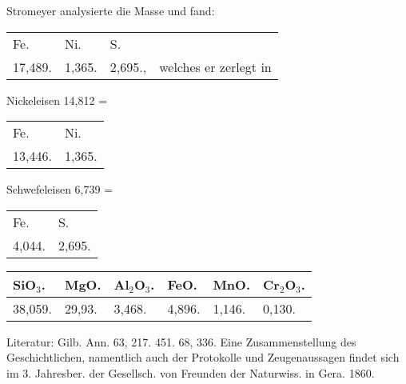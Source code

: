 \documentclass[a4paper, 11pt, oneside]{article}
\begin{document}
Stromeyer analysierte die Masse und fand:
\begin{table}[!ht]
    \centering\swabfamily\Large
    \begin{tabular}{l l l l}
        Fe. & Ni. & S. & \\
        17,489. & 1,365. & 2,695., & welches er zerlegt in \\
    \end{tabular}
\end{table}

\begin{center}
Nickeleisen 14,812 =
\end{center}
\begin{table}[!ht]
    \centering\swabfamily\Large
    \begin{tabular}{l l}
        Fe. & Ni. \\
        13,446. & 1,365. \\
    \end{tabular}
\end{table}

\begin{center}
Schwefeleisen 6,739 =
\end{center}
\begin{table}[!ht]
    \centering\swabfamily\Large
    \begin{tabular}{l l}
        Fe. & S. \\
        4,044. & 2,695. \\
    \end{tabular}
\end{table}

\begin{table}[!ht]
    \centering\swabfamily\Large
    \begin{tabular}{l l l l l l}
        SiO$_{3}$. & MgO. & Al$_{2}$O$_{3}$. & FeO. & MnO. & Cr$_{2}$O$_{3}$. \\ \hline
        38,059. & 29,93. & 3,468. & 4,896. & 1,146. & 0,130. \\
    \end{tabular}
\end{table}

\normalsize
Literatur: Gilb. Ann. 63, 217. 451. 68, 336. Eine Zusammenstellung des Geschichtlichen, namentlich auch der Protokolle und Zeugenaussagen findet sich im 3. Jahresber. der Gesellsch. von Freunden der Naturwiss. in Gera. 1860.
\subsection{}
\LARGE
\end{document}
